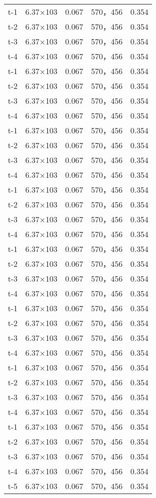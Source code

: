 \documentclass[../../main.tex]{subfiles}
\begin{document}
\begin{longtable}{ccccc}
t-1     &6.37×103       &0.067  &570，456        &0.354\\
t-2     &6.37×103       &0.067  &570，456        &0.354\\
t-3     &6.37×103       &0.067  &570，456        &0.354\\
t-4     &6.37×103       &0.067  &570，456        &0.354\\
t-1     &6.37×103       &0.067  &570，456        &0.354\\
t-2     &6.37×103       &0.067  &570，456        &0.354\\
t-3     &6.37×103       &0.067  &570，456        &0.354\\
t-4     &6.37×103       &0.067  &570，456        &0.354\\
t-1     &6.37×103       &0.067  &570，456        &0.354\\
t-2     &6.37×103       &0.067  &570，456        &0.354\\
t-3     &6.37×103       &0.067  &570，456        &0.354\\
t-4     &6.37×103       &0.067  &570，456        &0.354\\
t-1     &6.37×103       &0.067  &570，456        &0.354\\
t-2     &6.37×103       &0.067  &570，456        &0.354\\
t-3     &6.37×103       &0.067  &570，456        &0.354\\
t-4     &6.37×103       &0.067  &570，456        &0.354\\
t-1     &6.37×103       &0.067  &570，456        &0.354\\
t-2     &6.37×103       &0.067  &570，456        &0.354\\
t-3     &6.37×103       &0.067  &570，456        &0.354\\
t-4     &6.37×103       &0.067  &570，456        &0.354\\
t-1     &6.37×103       &0.067  &570，456        &0.354\\
t-2     &6.37×103       &0.067  &570，456        &0.354\\
t-3     &6.37×103       &0.067  &570，456        &0.354\\
t-4     &6.37×103       &0.067  &570，456        &0.354\\
t-1     &6.37×103       &0.067  &570，456        &0.354\\
t-2     &6.37×103       &0.067  &570，456        &0.354\\
t-3     &6.37×103       &0.067  &570，456        &0.354\\
t-4     &6.37×103       &0.067  &570，456        &0.354\\
t-1     &6.37×103       &0.067  &570，456        &0.354\\
t-2     &6.37×103       &0.067  &570，456        &0.354\\
t-3     &6.37×103       &0.067  &570，456        &0.354\\
t-4     &6.37×103       &0.067  &570，456        &0.354\\
t-5     &6.37×103       &0.067  &570，456        &0.354\\ 
\end{longtable}
\end{document}
